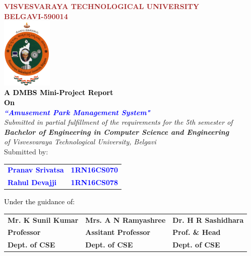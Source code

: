
\begin{titlepage}
\begin{center}
\break\break
\textup{\large {\textcolor{brown}{\bf VISVESVARAYA TECHNOLOGICAL UNIVERSITY} \\ {\textcolor{brown}{\bf BELGAVI-590014}}}}\\[0.1in]
\includegraphics[width=0.18\textwidth]{./VTU.png}\\[0.1in]
\textup{\small {\textcolor{black}{\textbf {A DMBS Mini-Project Report} \\ {\textbf {On}}}}} \\[0.2in]
\textup{\large {\textcolor{blue}{\textbf {\textit {``Amusement Park Management System"}}}}} \\[0.2in]
\textup{{\textit {Submitted in partial fulfillment of the requirements for the 5th semester of} \\ {\textbf {\textit {Bachelor of Engineering in Computer Science and Engineering}} \\ \textit {of Visvesvaraya Technological University, Belgavi}}}}\\[0.15in]
\textup{Submitted by:}
\break\break
\begin{tabular}{l  l}
\textcolor{blue}{\textbf{Pranav Srivatsa}} & \textcolor{blue}{\hspace{2.7cm}\textbf{1RN16CS070}}\\[0.3in]
\textcolor{blue}{\textbf{Rahul Devajji}} & \textcolor{blue}{\hspace{2.7cm}\textbf{1RN16CS078}}\\
\end{tabular}
\break\break\break\break
\textup{\normalsize {\textcolor{black}{ Under the guidance of:}}}\break\break
\begin{tabular}{l l l}
\textbf{Mr. K Sunil Kumar} & \hspace{0.7cm}\textbf{Mrs. A N Ramyashree} & \hspace{0.7cm}\textbf{Dr. H R Sashidhara}\\
\textbf{Professor} & \hspace{0.7cm}\textbf{Assitant Professor}  & \hspace{0.7cm}\textbf{Prof. \& Head}\\
\textbf{Dept. of CSE} & \hspace{0.7cm}\textbf{Dept. of CSE}  & \hspace{0.7cm}\textbf{Dept. of CSE}\\[0.1in]
\end{tabular}


\end{center}
\end{titlepage}
